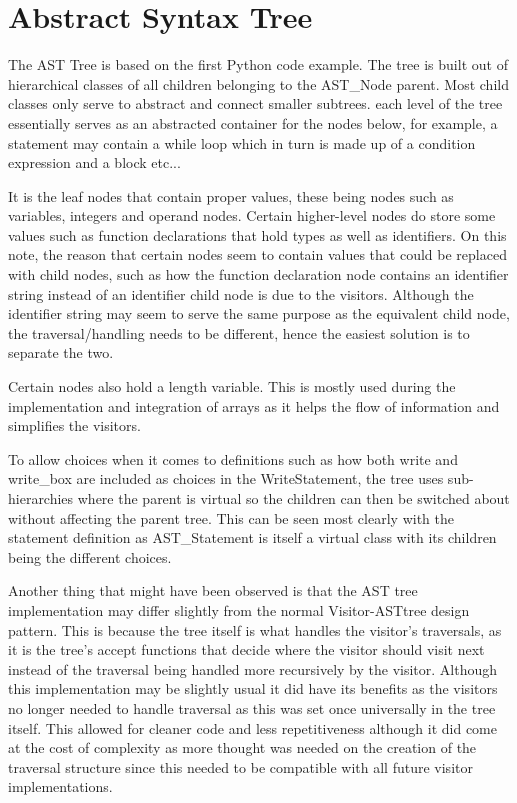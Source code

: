 \documentclass[12pt, a4paper]{report}
\begin{document}
\section{Abstract Syntax Tree}
The AST Tree is based on the first Python code example. The tree is built out of hierarchical classes of all children belonging to the AST\_Node parent. Most child classes only serve to abstract and connect smaller subtrees. each level of the tree essentially serves as an abstracted container for the nodes below, for example, a statement may contain a while loop which in turn is made up of a condition expression and a block etc... 

It is the leaf nodes that contain proper values, these being nodes such as variables, integers and operand nodes. Certain higher-level nodes do store some values such as function declarations that hold types as well as identifiers. On this note, the reason that certain nodes seem to contain values that could be replaced with child nodes, such as how the function declaration node contains an identifier string instead of an identifier child node is due to the visitors. Although the identifier string may seem to serve the same purpose as the equivalent child node, the traversal/handling needs to be different, hence the easiest solution is to separate the two.

Certain nodes also hold a length variable. This is mostly used during the implementation and integration of arrays as it helps the flow of information and simplifies the visitors.

To allow choices when it comes to definitions such as how both write and write\_box are included as choices in the WriteStatement, the tree uses sub-hierarchies where the parent is virtual so the children can then be switched about without affecting the parent tree. This can be seen most clearly with the statement definition as AST\_Statement is itself a virtual class with its children being the different choices.

Another thing that might have been observed is that the AST tree implementation may differ slightly from the normal Visitor-ASTtree design pattern. This is because the tree itself is what handles the visitor's traversals, as it is the tree's accept functions that decide where the visitor should visit next instead of the traversal being handled more recursively by the visitor. Although this implementation may be slightly usual it did have its benefits as the visitors no longer needed to handle traversal as this was set once universally in the tree itself. This allowed for cleaner code and less repetitiveness although it did come at the cost of complexity as more thought was needed on the creation of the traversal structure since this needed to be compatible with all future visitor implementations.
\end{document}
